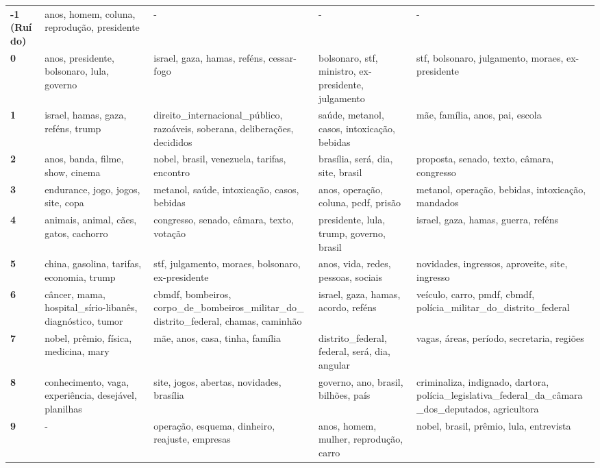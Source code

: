 \begin{xltabular}{\textwidth}{@{}l >{\RaggedRight\arraybackslash}X >{\RaggedRight\arraybackslash}X >{\RaggedRight\arraybackslash}X >{\RaggedRight\arraybackslash}X@{}}
    \textbf{-1 (Ruído)} & anos, homem, coluna, reprodução, presidente & - & - & - \\
    \textbf{0} & anos, presidente, bolsonaro, lula, governo & israel, gaza, hamas, reféns, cessar-fogo & bolsonaro, stf, ministro, ex-presidente, julgamento & stf, bolsonaro, julgamento, moraes, ex-presidente \\
    \textbf{1} & israel, hamas, gaza, reféns, trump & direito\_internacional\_público, razoáveis, soberana, deliberações, decididos & saúde, metanol, casos, intoxicação, bebidas & mãe, família, anos, pai, escola \\
    \textbf{2} & anos, banda, filme, show, cinema & nobel, brasil, venezuela, tarifas, encontro & brasília, será, dia, site, brasil & proposta, senado, texto, câmara, congresso \\
    \textbf{3} & endurance, jogo, jogos, site, copa & metanol, saúde, intoxicação, casos, bebidas & anos, operação, coluna, pcdf, prisão & metanol, operação, bebidas, intoxicação, mandados \\
    \textbf{4} & animais, animal, cães, gatos, cachorro & congresso, senado, câmara, texto, votação & presidente, lula, trump, governo, brasil & israel, gaza, hamas, guerra, reféns \\
    \textbf{5} & china, gasolina, tarifas, economia, trump & stf, julgamento, moraes, bolsonaro, ex-presidente & anos, vida, redes, pessoas, sociais & novidades, ingressos, aproveite, site, ingresso \\
    \textbf{6} & câncer, mama, hospital\_sírio-libanês, diagnóstico, tumor & cbmdf, bombeiros, corpo\_de\_bombeiros\_militar\_do\_distrito\_federal, chamas, caminhão & israel, gaza, hamas, acordo, reféns & veículo, carro, pmdf, cbmdf, polícia\_militar\_do\_distrito\_federal \\
    \textbf{7} & nobel, prêmio, física, medicina, mary & mãe, anos, casa, tinha, família & distrito\_federal, federal, será, dia, angular & vagas, áreas, período, secretaria, regiões \\
    \textbf{8} & conhecimento, vaga, experiência, desejável, planilhas & site, jogos, abertas, novidades, brasília & governo, ano, brasil, bilhões, país & criminaliza, indignado, dartora, polícia\_legislativa\_federal\_da\_câmara\_dos\_deputados, agricultora \\
    \textbf{9} & - & operação, esquema, dinheiro, reajuste, empresas & anos, homem, mulher, reprodução, carro & nobel, brasil, prêmio, lula, entrevista \\
\end{xltabular}
\endgroup
